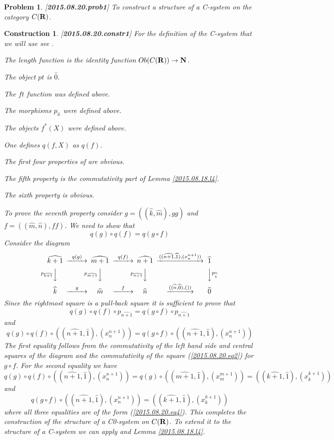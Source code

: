 \documentclass[11pt]{article}
\newtheorem{problem}[proposition]{Problem}
\newtheorem{construction}[proposition]{Construction}
\newcommand{\llabel}[1]{\label{#1}[{\bf #1}]}
\newcommand{\sr}{\rightarrow}
\newcommand{\nn}{{\bf N\rm}}
\newcommand{\rr}{{\bf R}}
\newcommand{\wh}{\widehat}
\begin{document}
%
\begin{problem}
\llabel{2015.08.20.prob1}
To construct a structure of a C-system on the category $C(\rr)$.
\end{problem}
%
\begin{construction}\rm
\llabel{2015.08.20.constr1}
For the definition of the C-system that we will use see \cite[Def. 2.1 and Def. 2.3]{Csubsystems}. 

The length function is the identity function $Ob(C(\rr))\sr \nn$. 

The object $pt$ is $\wh{0}$. 

The $ft$ function was defined above. 

The morphisms $p_{\wh{n}}$ were defined above. 

The objects $f^*(X)$ were defined above. 

One defines $q(f,X)$ as $q(f)$. 

The first four properties of \cite[Def. 2.1]{Csubsystems} are obvious. 

The fifth property is the commutativity part of Lemma  \ref{2015.08.18.l4}. 

The sixth property is obvious. 

To prove the seventh property consider $g=((\wh{k},\wh{m}),gg)$ and $f=((\wh{m},\wh{n}),ff)$. We need to show that
%
$$q(g)\circ q(f)=q(g\circ f)$$
%
Consider the diagram
%
$$
\begin{CD}
\wh{k+1} @>q(g)>> \wh{m+1} @>q(f)>> \wh{n+1} @>((\wh{n+1},\wh{1}),(x_n^{n+1}))>> \wh{1}\\
@Vp_{\wh{k+1}}VV @Vp_{\wh{m+1}}VV @Vp_{\wh{n+1}}VV @VVp_{\wh{1}}V\\
\wh{k} @>g>> \wh{m} @>f>> \wh{n} @>((\wh{n},\wh{0}),())>> \wh{0}
\end{CD}
$$
%
Since the rightmost square is a pull-back square it is sufficient to prove that
%
$$q(g)\circ q(f)\circ p_{\wh{n+1}}=q(g\circ f)\circ p_{\wh{n+1}}$$
%
and
%
$$q(g)\circ q(f)\circ ((\wh{n+1},\wh{1}),(x_n^{n+1}))=q(g\circ f)\circ ((\wh{n+1},\wh{1}),(x_n^{n+1}))$$
%
The first equality follows from the commutativity of the left hand side and central squares of the diagram and the commutativity of the square (\ref{2015.08.20.eq2}) for $g\circ f$. For the second equality we have
%
$$q(g)\circ q(f)\circ ((\wh{n+1},\wh{1}),(x_n^{n+1}))=q(g)\circ ((\wh{m+1},\wh{1}),(x_m^{m+1}))=((\wh{k+1},\wh{1}),(x_k^{k+1}))$$
%
and
%
$$q(g\circ f)\circ ((\wh{n+1},\wh{1}),(x_n^{n+1}))=((\wh{k+1},\wh{1}),(x_k^{k+1}))$$
%
where all three equalities are of the form (\ref{2015.08.20.eq4}). This completes the construction of the structure of a  C0-system on $C(\rr)$. To extend it to the structure of a C-system we can apply \cite[Prop. 2.4]{Csubsystems} and Lemma \ref{2015.08.18.l4}. 
\end{construction}
\end{document}
